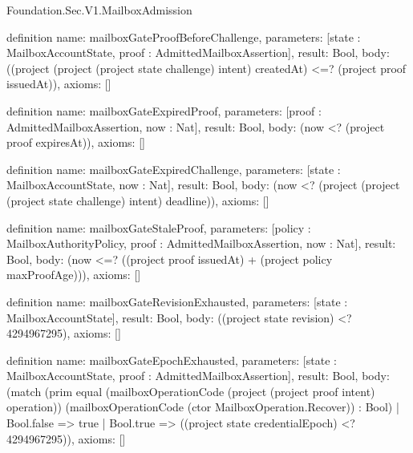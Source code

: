 \begin{lexlean}{Foundation.Sec.V1.MailboxAdmission}
\begin{semanticmodule}
definition{
  name: mailboxGateProofBeforeChallenge,
  parameters: [state : MailboxAccountState, proof : AdmittedMailboxAssertion],
  result: Bool,
  body: ((project (project (project state challenge) intent) createdAt) <=? (project proof issuedAt)),
  axioms: []
}

definition{
  name: mailboxGateExpiredProof,
  parameters: [proof : AdmittedMailboxAssertion, now : Nat],
  result: Bool,
  body: (now <? (project proof expiresAt)),
  axioms: []
}

definition{
  name: mailboxGateExpiredChallenge,
  parameters: [state : MailboxAccountState, now : Nat],
  result: Bool,
  body: (now <? (project (project (project state challenge) intent) deadline)),
  axioms: []
}

definition{
  name: mailboxGateStaleProof,
  parameters: [policy : MailboxAuthorityPolicy, proof : AdmittedMailboxAssertion, now : Nat],
  result: Bool,
  body: (now <=? ((project proof issuedAt) + (project policy maxProofAge))),
  axioms: []
}

definition{
  name: mailboxGateRevisionExhausted,
  parameters: [state : MailboxAccountState],
  result: Bool,
  body: ((project state revision) <? 4294967295),
  axioms: []
}

definition{
  name: mailboxGateEpochExhausted,
  parameters: [state : MailboxAccountState, proof : AdmittedMailboxAssertion],
  result: Bool,
  body: (match (prim equal (mailboxOperationCode (project (project proof intent) operation)) (mailboxOperationCode (ctor MailboxOperation.Recover)) : Bool)
    | Bool.false => true
    | Bool.true => ((project state credentialEpoch) <? 4294967295)),
  axioms: []
}


\end{semanticmodule}
\end{lexlean}
